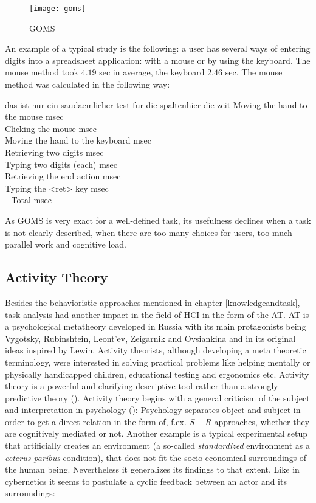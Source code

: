 \begin{figure}[ht]
	\centering
  \texttt{[image: goms]}
	\caption{GOMS}
	\label{fig3}
\end{figure}

An example of a typical study is the following: a user has several ways of entering digits into a spreadsheet application: with a mouse or by using the keyboard. The mouse method took $4.19$ sec in average, the keyboard $2.46$ sec. The mouse method was calculated in the following way:

\begin{tabbing}
das ist nur ein saudaemlicher test fur die spalten\=  hier die zeit\kill
Moving the hand to the mouse  msec\\
Clicking the mouse  msec\\
Moving the hand to the keyboard  msec\\
Retrieving two digits  msec\\
Typing two digits (each) msec\\
Retrieving the end action  msec\\
Typing the <ret> key  msec\\
\_Total  msec
\end{tabbing}

As \ac{GOMS} is very exact for a well-defined task, its usefulness declines when a task is not clearly described, when there are too many choices for users, too much parallel work and cognitive load. 

\subsection{Activity Theory}
Besides the behavioristic approaches mentioned in chapter \ref{knowledgeandtask}, task analysis had another impact in the field of \ac{HCI} in the form of the \ac{AT}. \acs{AT} is a psychological metatheory developed in Russia with its main protagonists being Vygotsky, Rubinshtein, Leont'ev, Zeigarnik and Ovsiankina  and in its original ideas inspired by Lewin. Activity theorists, although developing a meta theoretic terminology, were interested in solving practical problems like helping mentally or physically handicapped children, educational testing and ergonomics etc. Activity theory is a powerful and clarifying descriptive tool rather than a strongly predictive theory (\cite{nardi1996activity}). Activity theory begins with a general criticism of the subject and interpretation in psychology (\cite{leont1974problem}): Psychology separates object and subject in order to get a direct relation in the form of, f.ex. $S-R$ approaches, whether they are cognitively mediated or not. Another example is a typical experimental setup that artificially creates an environment (a so-called \textit{standardized} environment as a \textit{ceterus paribus} condition), that does not fit the socio-economical surroundings of the human being. Nevertheless it generalizes its findings to that extent. Like in cybernetics it seems to postulate a cyclic feedback between an actor and its surroundings: 


